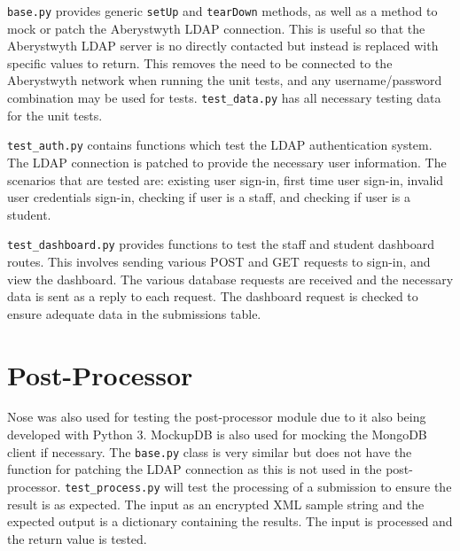 \texttt{base.py} provides generic \texttt{setUp} and \texttt{tearDown} methods, as well as a method to mock or patch the Aberystwyth LDAP connection. This is useful so that the Aberystwyth LDAP server is no directly contacted but instead is replaced with specific values to return. This removes the need to be connected to the Aberystwyth network when running the unit tests, and any username/password combination may be used for tests. \texttt{test\_data.py} has all necessary testing data for the unit tests.

\texttt{test\_auth.py} contains functions which test the LDAP authentication system. The LDAP connection is patched to provide the necessary user information. The scenarios that are tested are: existing user sign-in, first time user sign-in, invalid user credentials sign-in, checking if user is a staff, and checking if user is a student.

\texttt{test\_dashboard.py} provides functions to test the staff and student dashboard routes. This involves sending various POST and GET requests to sign-in, and view the dashboard. The various database requests are received and the necessary data is sent as a reply to each request. The dashboard request is checked to ensure adequate data in the submissions table.

\section{Post-Processor}
Nose was also used for testing the post-processor module due to it also being developed with Python 3. MockupDB is also used for mocking the MongoDB client if necessary. The \texttt{base.py} class is very similar but does not have the function for patching the LDAP connection as this is not used in the post-processor. \texttt{test\_process.py} will test the processing of a submission to ensure the result is as expected. The input as an encrypted XML sample string and the expected output is a dictionary containing the results. The input is processed and the return value is tested.
